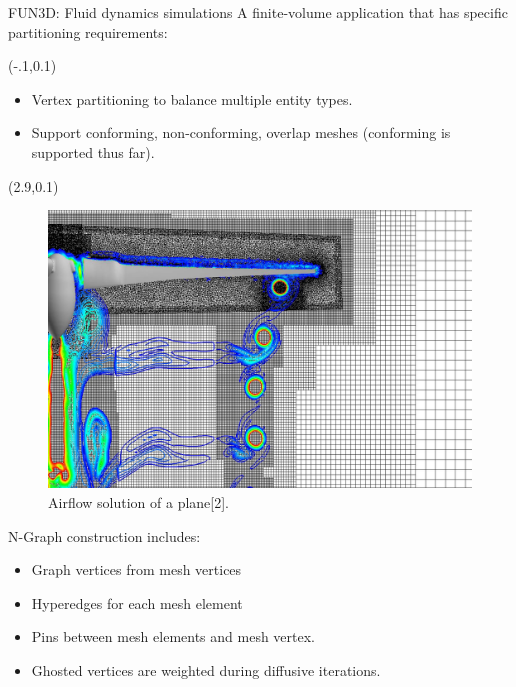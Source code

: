 \documentclass{beamer}
\begin{document}
\begin{textblock}{15.6}
\begin{textblock}{5.2}
    \begin{block}{\centering FUN3D: Fluid dynamics simulations}
      A finite-volume application that has specific partitioning requirements:
      \vspace{-.5cm}
      \begin{textblock}{3.4}(-.1,0.1)
      \begin{itemize}
      \item Vertex partitioning to balance multiple entity types.
      \item Support conforming, non-conforming, overlap meshes (conforming is supported thus far).
      \end{itemize}
      \end{textblock}
      \begin{textblock}{2.5}(2.9,0.1)
        \begin{figure}
          \centering
          \includegraphics[width=.8\textwidth]{../figures/FUN3D.jpg}
          \caption{Airflow solution of a plane[2].} 
        \end{figure}
      \end{textblock}
      \vspace{6.1cm}
      N-Graph construction includes:
      \vspace{-.1cm}
      \begin{itemize}
      \item Graph vertices from mesh vertices
      \item Hyperedges for each mesh element
      \item Pins between mesh elements and mesh vertex.
      \item Ghosted vertices are weighted during diffusive iterations.
      \end{itemize}


\end{block}
\end{textblock}
\end{textblock}
\end{document}
